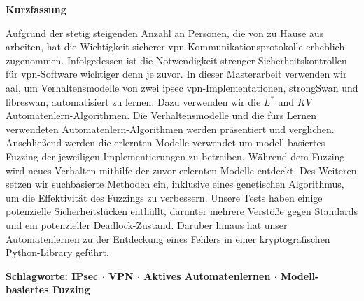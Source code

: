 \begin{changemargin}{15mm}{15mm}
\begin{center}
{\Large\bfseries Kurzfassung}
\end{center}
\vspace*{2mm}

Aufgrund der stetig steigenden Anzahl an Personen, die von zu Hause aus arbeiten, hat die Wichtigkeit sicherer \acl{vpn}-Kommunikationsprotokolle erheblich zugenommen. Infolgedessen ist die Notwendigkeit strenger Sicherheitskontrollen für \acl{vpn}-Software wichtiger denn je zuvor. In dieser Masterarbeit verwenden wir \acl{aal}, um Verhaltensmodelle von zwei \acl{ipsec} \acl{vpn}-Implementationen, strongSwan und libreswan, automatisiert zu lernen. Dazu verwenden wir die $L^*$ und $KV$ Automatenlern-Algorithmen. Die Verhaltensmodelle und die fürs Lernen verwendeten Automatenlern-Algorithmen werden präsentiert und verglichen. Anschließend werden die erlernten Modelle verwendet um modell-basiertes Fuzzing der jeweiligen Implementierungen zu betreiben. Während dem Fuzzing wird neues Verhalten mithilfe der zuvor erlernten Modelle entdeckt. Des Weiteren setzen wir suchbasierte Methoden ein, inklusive eines genetischen Algorithmus, um die Effektivität des Fuzzings zu verbessern. Unsere Tests haben einige potenzielle Sicherheitslücken enthüllt, darunter mehrere Verstöße gegen Standards und ein potenzieller Deadlock-Zustand. Darüber hinaus hat unser Automatenlernen zu der Entdeckung eines Fehlers in einer kryptografischen Python-Library geführt.

\vspace{5mm}
\noindent
{\large\bfseries Schlagworte: IPsec $\cdot$ VPN $\cdot$ Aktives Automatenlernen $\cdot$ Modell-basiertes Fuzzing}


\end{changemargin}

